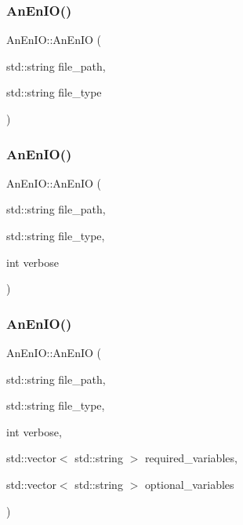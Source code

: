 \mbox{\label{class_an_en_i_o_af19d6df2100a5922affa88b37a825caf}} 
\subsubsection{\texorpdfstring{An\+En\+I\+O()}{AnEnIO()}\hspace{0.1cm}{\footnotesize\ttfamily [4/6]}}
{\footnotesize\ttfamily An\+En\+I\+O\+::\+An\+En\+IO (\begin{DoxyParamCaption}\item[{std\+::string}]{file\+\_\+path,  }\item[{std\+::string}]{file\+\_\+type }\end{DoxyParamCaption})}

\mbox{\label{class_an_en_i_o_a6e33a9ad4a80aabf6c78aae3bcbbf8dd}} 
\subsubsection{\texorpdfstring{An\+En\+I\+O()}{AnEnIO()}\hspace{0.1cm}{\footnotesize\ttfamily [5/6]}}
{\footnotesize\ttfamily An\+En\+I\+O\+::\+An\+En\+IO (\begin{DoxyParamCaption}\item[{std\+::string}]{file\+\_\+path,  }\item[{std\+::string}]{file\+\_\+type,  }\item[{int}]{verbose }\end{DoxyParamCaption})}

\mbox{\label{class_an_en_i_o_a054dfff57b8d02d333020d9efb54f14a}} 
\subsubsection{\texorpdfstring{An\+En\+I\+O()}{AnEnIO()}\hspace{0.1cm}{\footnotesize\ttfamily [6/6]}}
{\footnotesize\ttfamily An\+En\+I\+O\+::\+An\+En\+IO (\begin{DoxyParamCaption}\item[{std\+::string}]{file\+\_\+path,  }\item[{std\+::string}]{file\+\_\+type,  }\item[{int}]{verbose,  }\item[{std\+::vector$<$ std\+::string $>$}]{required\+\_\+variables,  }\item[{std\+::vector$<$ std\+::string $>$}]{optional\+\_\+variables }\end{DoxyParamCaption})}

